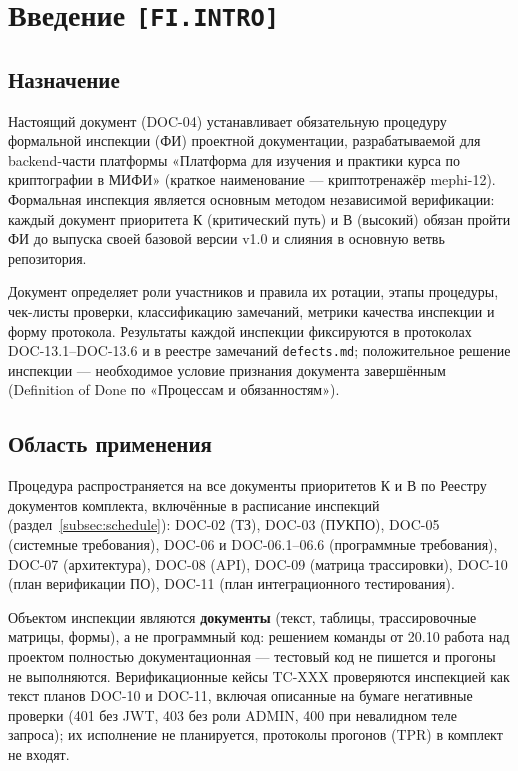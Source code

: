 \documentclass[12pt,a4paper]{article}
\begin{document}
\clearpage
\tableofcontents
\clearpage


\section{Введение \texttt{[FI.INTRO]}}

\subsection{Назначение}

Настоящий документ (DOC-04) устанавливает обязательную процедуру формальной
инспекции (ФИ) проектной документации, разрабатываемой для backend-части
платформы «Платформа для изучения и практики курса по криптографии в МИФИ»
(краткое наименование --- криптотренажёр mephi-12). Формальная инспекция является
основным методом независимой верификации: каждый документ приоритета К
(критический путь) и В (высокий) обязан пройти ФИ до выпуска своей базовой
версии v1.0 и слияния в основную ветвь репозитория.

Документ определяет роли участников и правила их ротации, этапы процедуры,
чек-листы проверки, классификацию замечаний, метрики качества инспекции и форму
протокола. Результаты каждой инспекции фиксируются в протоколах
DOC-13.1--DOC-13.6 и в реестре замечаний \texttt{defects.md}; положительное
решение инспекции --- необходимое условие признания документа завершённым
(Definition of Done по «Процессам и обязанностям»).

\subsection{Область применения}

Процедура распространяется на все документы приоритетов К и В по Реестру
документов комплекта, включённые в расписание инспекций (раздел~\ref{subsec:schedule}):
DOC-02 (ТЗ), DOC-03 (ПУКПО), DOC-05 (системные требования), DOC-06 и
DOC-06.1--06.6 (программные требования), DOC-07 (архитектура), DOC-08 (API),
DOC-09 (матрица трассировки), DOC-10 (план верификации ПО), DOC-11 (план
интеграционного тестирования).

Объектом инспекции являются \textbf{документы} (текст, таблицы, трассировочные
матрицы, формы), а не программный код: решением команды от 20.10 работа над
проектом полностью документационная --- тестовый код не пишется и прогоны не
выполняются. Верификационные кейсы TC-XXX проверяются инспекцией как текст
планов DOC-10 и DOC-11, включая описанные на бумаге негативные проверки
(401 без JWT, 403 без роли ADMIN, 400 при невалидном теле запроса); их
исполнение не планируется, протоколы прогонов (TPR) в комплект не входят.
\end{document}
